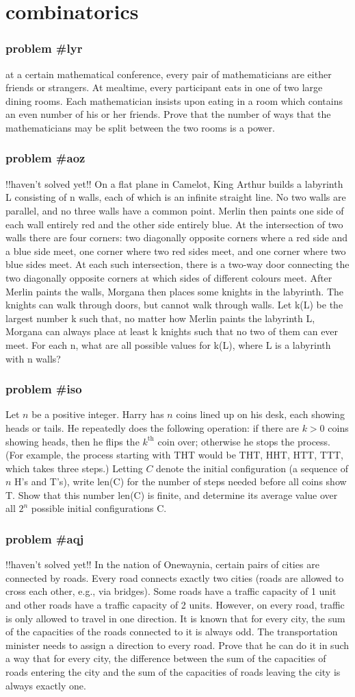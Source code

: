 \documentclass{article}
\newcommand{\problem}[1]{\subsubsection*{\textbf{problem \##1}}}
\newcommand{\chapter}[1]{\section*{#1}}
\begin{document}
\chapter{combinatorics}
\problem{lyr} at a certain mathematical conference, every pair of mathematicians are either friends or strangers.
At mealtime, every participant eats in one of two large dining rooms. Each mathematician insists upon eating in a room which contains an even number of his or her friends. Prove that the number of ways that the mathematicians may be split between the two rooms is a power.
\problem{aoz} !!haven't solved yet!! On a flat plane in Camelot, King Arthur builds a labyrinth L consisting of n walls,
each of which is an infinite straight line. No two walls are parallel, and no three walls have a
common point. Merlin then paints one side of each wall entirely red and the other side entirely
blue.
At the intersection of two walls there are four corners: two diagonally opposite corners
where a red side and a blue side meet, one corner where two red sides meet, and one corner
where two blue sides meet. At each such intersection, there is a two-way door connecting the
two diagonally opposite corners at which sides of different colours meet.
After Merlin paints the walls, Morgana then places some knights in the labyrinth. The
knights can walk through doors, but cannot walk through walls.
Let k(L) be the largest number k such that, no matter how Merlin paints the labyrinth L,
Morgana can always place at least k knights such that no two of them can ever meet. For
each n, what are all possible values for k(L), where L is a labyrinth with n walls?
\problem{iso} Let $n$ be a positive integer. Harry has $n$ coins lined up on his desk, each showing
heads or tails. He repeatedly does the following operation: if there are $k>0$ coins showing heads, then he flips the $k^\text{th}$ coin over; otherwise he stops the process. (For example, the
process starting with THT would be THT, HHT, HTT, TTT, which takes three steps.)
Letting $C$ denote the initial configuration (a sequence of $n$ H’s and T’s), write len(C) for the
number of steps needed before all coins show T. Show that this number len(C) is finite, and
determine its average value over all $2^n$ possible initial configurations C.
\problem{aqj} !!haven't solved yet!! In the nation of Onewaynia, certain pairs of cities are connected by roads. Every road connects exactly two cities (roads are allowed to cross each other, e.g., via bridges). Some roads have a traffic capacity of 1 unit and other roads have a traffic capacity of 2 units. However, on every road, traffic is only allowed to travel in one direction. It is known that for every city, the sum of the capacities of the roads connected to it is always odd. The transportation minister needs to assign a direction to every road. Prove that he can do it in such a way that for every city, the difference between the sum of the capacities of roads entering the city and the sum of the capacities of roads leaving the city is always exactly one.
\end{document}
